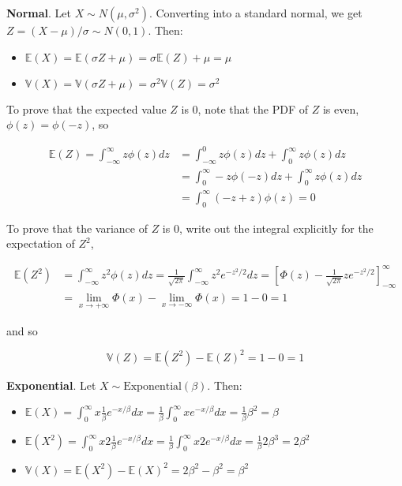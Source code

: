 \textbf{Normal}. Let \(X \sim N(\mu, \sigma^{2})\). Converting into a
standard normal, we get \(Z = (X - \mu) / \sigma \sim N(0, 1)\). Then:

\begin{itemize}[tightlist]
\item
  $ \mathbb{E}(X) = \mathbb{E}(\sigma Z + \mu) = \sigma \mathbb{E}(Z) +
  \mu = \mu$
\item
  $ \mathbb{V}(X) = \mathbb{V}(\sigma Z + \mu) = \sigma^{2}
  \mathbb{V}(Z) = \sigma^{2}$
\end{itemize}

To prove that the expected value \(Z\) is 0, note that the PDF of \(Z\)
is even, \(\phi(z) = \phi(-z)\), so

\begin{align*}
\mathbb{E}(Z) 
  = \int_{-\infty}^{\infty} z \phi(z) dz 
& = \int_{-\infty}^{0} z \phi(z) dz + \int_{0}^{\infty} z \phi(z) dz 
\\
& = \int_{0}^{\infty} -z \phi(-z) dz + \int_{0}^{\infty} z \phi(z) dz 
\\
& = \int_{0}^{\infty} (-z + z)\phi(z) = 0 
\end{align*}

To prove that the variance of \(Z\) is 0, write out the integral
explicitly for the expectation of \(Z^{2}\),

\begin{align*}
\mathbb{E}(Z^{2}) 
& = \int_{-\infty}^{\infty} z^{2} \phi(z) dz 
  = \frac{1}{\sqrt{2 \pi}} \int_{-\infty}^{\infty} z^{2} e^{-z^{2}/2} dz
  = \left[ \Phi(z) - \frac{1}{\sqrt{2 \pi}}  z e^{-z^{2}/2} \right]_{-\infty}^{\infty} 
\\
& = \lim_{x \rightarrow +\infty} \Phi(x) - \lim_{x \rightarrow -\infty} \Phi(x) 
  = 1 - 0 
  = 1
\end{align*}

and so

\[\mathbb{V}(Z) = \mathbb{E}(Z^{2}) - \mathbb{E}(Z)^{2} = 1 - 0 = 1\]

\textbf{Exponential}. Let \(X \sim \text{Exponential}(\beta)\). Then:

\begin{itemize}[tightlist]
\item
  \( \mathbb{E}(X) = \int_{0}^{\infty} x \frac{1}{\beta} e^{-x / \beta} dx = \frac{1}{\beta} \int_{0}^{\infty} x e^{-x / \beta}
  dx = \frac{1}{\beta} \beta^{2} = \beta \)
\item
  \( \mathbb{E}(X^{2}) = \int_{0}^{\infty} x2
  \frac{1}{\beta} e^{-x / \beta} dx = \frac{1}{\beta}
  \int_{0}^{\infty} x2 e^{-x / \beta} dx =
  \frac{1}{\beta} 2\beta^{3} = 2 \beta^{2} \)
\item
  \( \mathbb{V}(X) = \mathbb{E}(X^{2}) - \mathbb{E}(X)^{2} =
  2\beta^{2} - \beta^{2} = \beta^{2} \)
\end{itemize}

